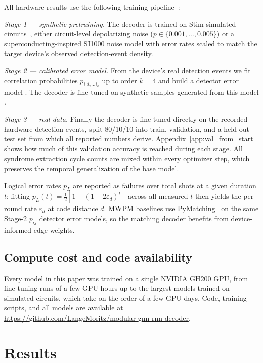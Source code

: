 \documentclass[aps,prxquantum,twocolumn,superscriptaddress,nofootinbib]{revtex4-2}
\begin{document}
All hardware results use the following training pipeline~\cite{bausch2024alphaqubit}:

\emph{Stage 1 --- synthetic pretraining.} The decoder is trained on Stim-simulated circuits~\cite{gidney2021stim}, either circuit-level depolarizing noise ($p \in \{0.001, \ldots, 0.005\}$) or a superconducting-inspired SI1000 noise model \cite{Gidney_2021} with error rates scaled to match the target device's observed detection-event density.

\emph{Stage 2 --- calibrated error model.} From the device's real detection events we fit correlation probabilities $p_{i_1 i_2 \ldots i_k}$ up to order $k=4$ and build a detector error model \cite{Spitz_2018, Remm_2025, chen2022calibrated}. The decoder is fine-tuned on synthetic samples generated from this model \cite{bausch2024alphaqubit}.

\emph{Stage 3 --- real data.} Finally the decoder is fine-tuned directly on the recorded hardware detection events, split 80/10/10 into train, validation, and a held-out test set from which all reported numbers derive. Appendix~\ref{app:val_from_start} shows how much of this validation accuracy is reached during each stage. All syndrome extraction cycle counts are mixed within every optimizer step, which preserves the temporal generalization of the base model.

Logical error rates $p_L$ are reported as failures over total shots at a given duration $t$; fitting $p_L(t) = \tfrac{1}{2}\left[1 - (1-2\varepsilon_d)^{t}\right]$ across all measured $t$ then yields the per-round rate $\varepsilon_d$ at code distance $d$. MWPM baselines use PyMatching~\cite{higgott2023sparse} on the same Stage-2 $p_{ij}$ detector error models, so the matching decoder benefits from device-informed edge weights.

\subsection{Compute cost and code availability}

Every model in this paper was trained on a single NVIDIA GH200 GPU, from fine-tuning runs of a few GPU-hours up to the largest models trained on simulated circuits, which take on the order of a few GPU-days. Code, training scripts, and all models are available at \url{https://github.com/LangeMoritz/modular-gnn-rnn-decoder}.

\section{Results}
\label{sec:results}
\end{document}
